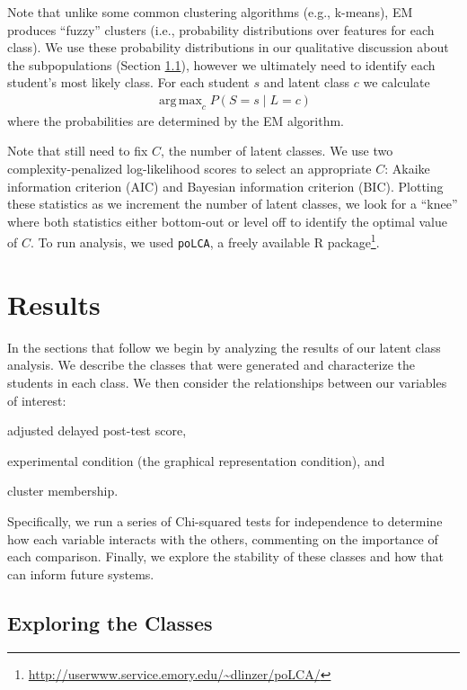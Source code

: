 \documentclass{edm_template}
\DeclareMathOperator*{\argmax}{arg\,max}
\begin{document}
Note that unlike some common clustering algorithms (e.g., k-means), EM produces ``fuzzy'' clusters (i.e., probability distributions over features for each class). We use these probability distributions in our qualitative discussion about the subpopulations (Section \ref{sec:exploring-classes}), however we ultimately need to identify each student's most likely class. For each student $s$ and latent class $c$ we calculate
\begin{align}
\argmax_{c} P(S = s \;|\; L = c)
\label{eqn:LCA-argmax}
\end{align}
where the probabilities are determined by the EM algorithm.

Note that still need to fix $C$, the number of latent classes. We use two complexity-penalized log-likelihood scores to select an appropriate $C$: Akaike information criterion (AIC) and Bayesian information criterion (BIC). Plotting these statistics as we increment the number of latent classes, we look for a ``knee'' where both statistics either bottom-out or level off to identify the optimal value of $C$. To run analysis, we used \texttt{poLCA}, a freely available R package\footnote{\url{http://userwww.service.emory.edu/~dlinzer/poLCA/}}.

\section{Results}
\label{sec:results}

In the sections that follow we begin by analyzing the results of our latent class analysis. We describe the classes that were generated and characterize the students in each class. We then consider the relationships between our variables of interest: 
\begin{inparaenum}[\itshape (a)]
\item adjusted delayed post-test score,
\item experimental condition (the graphical representation condition), and
\item cluster membership.
\end{inparaenum}
Specifically, we run a series of Chi-squared tests for independence to determine how each variable interacts with the others, commenting on the importance of each comparison. Finally, we explore the stability of these classes and how that can inform future systems.

\subsection{Exploring the Classes}
\label{sec:exploring-classes}
\end{document}
